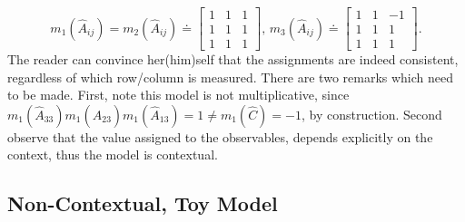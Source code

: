 \begin{equation}
m_{1}(\hat{A}_{ij})=m_{2}(\hat{A}_{ij})\doteq\left[\begin{array}{ccc}
1 & 1 & 1\\
1 & 1 & 1\\
1 & 1 & 1
\end{array}\right],\,m_{3}(\hat{A}_{ij})\doteq\left[\begin{array}{ccc}
1 & 1 & -1\\
1 & 1 & 1\\
1 & 1 & 1
\end{array}\right].\label{eq:memoryAssignments}
\end{equation}
The reader can convince her(him)self that the assignments are indeed
consistent, regardless of which row/column is measured. There are
two remarks which need to be made. First, note this model is not multiplicative,
since $m_{1}(\hat{A}_{33})m_{1}(\hat{A}_{23})m_{1}(\hat{A}_{13})=1\neq m_{1}(\hat{C})=-1$,
by construction. Second observe that the value assigned to the observables,
depends explicitly on the context, thus the model is contextual. 


\subsection{Non-Contextual, Toy Model \label{sub:Non-Contextual-Toy-Model}}

